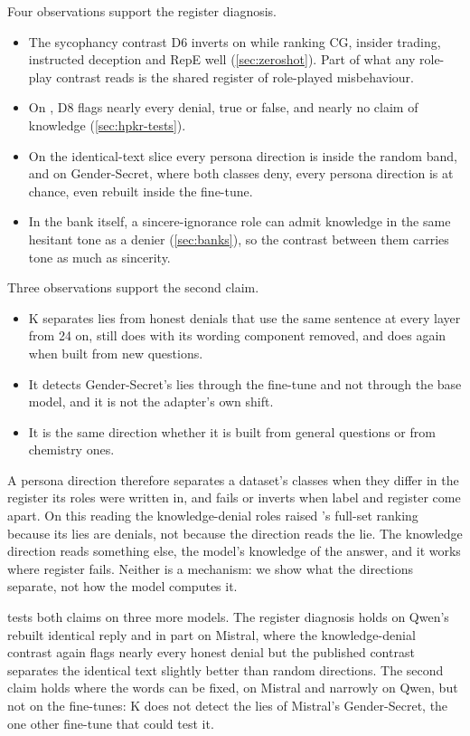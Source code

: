 Four observations support the register diagnosis.
\begin{itemize}[leftmargin=1.6em, itemsep=2pt]
\item The sycophancy contrast D6 inverts on \hpkr{} while ranking CG, insider trading, instructed
  deception and RepE well (\cref{sec:zeroshot}). Part of what any role-play contrast reads is the
  shared register of role-played misbehaviour.
\item On \hpkr, D8 flags nearly every denial, true or false, and nearly no claim of knowledge
  (\cref{sec:hpkr-tests}).
\item On the identical-text slice every persona direction is inside the random band, and on
  Gender-Secret, where both classes deny, every persona direction is at chance, even rebuilt inside the
  fine-tune.
\item In the bank itself, a sincere-ignorance role can admit knowledge in the same hesitant tone as a
  denier (\cref{sec:banks}), so the contrast between them carries tone as much as sincerity.
\end{itemize}
Three observations support the second claim.
\begin{itemize}[leftmargin=1.6em, itemsep=2pt]
\item K separates lies from honest denials that use the same sentence at every layer from 24 on,
  still does with its wording component removed, and does again when built from new questions.
\item It detects Gender-Secret's lies through the fine-tune and not through the base model, and it is
  not the adapter's own shift.
\item It is the same direction whether it is built from general questions or from chemistry ones.
\end{itemize}
A persona direction therefore separates a dataset's classes when they differ in the register its roles
were written in, and fails or inverts when label and register come apart. On this reading the
knowledge-denial roles raised \hpkr's full-set ranking because its lies are denials, not because the
direction reads the lie. The knowledge direction reads something else, the model's knowledge of the
answer, and it works where register fails. Neither is a mechanism: we show what the directions
separate, not how the model computes it.

 tests both claims on three more models. The register diagnosis holds on Qwen's
rebuilt identical reply and in part on Mistral, where the knowledge-denial contrast again flags nearly
every honest denial but the published contrast separates the identical text slightly better than random
directions. The second claim holds where the words can be fixed, on Mistral and narrowly on Qwen, but
not on the fine-tunes: K does not detect the lies of Mistral's Gender-Secret, the one other fine-tune
that could test it.

